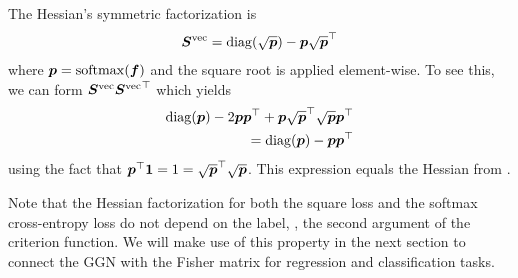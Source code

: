 \begin{example}\label{ex:crossentropyloss_hessian_factorization}
  The Hessian's symmetric factorization is \citep[\eg][]{papyan2019measurements}
  \begin{align*}
    {\bm{S}}^{\operatorname{vec}} = \operatorname{diag}(\sqrt{{\bm{p}}}) - {\bm{p}} \sqrt{{\bm{p}}}^{\top}
  \end{align*}
  where ${\bm{p}} = \mathrm{softmax}({\bm{f}})$ and the square root is applied element-wise.
  To see this, we can form ${\bm{S}}^{\operatorname{vec}} {{\bm{S}}^{\operatorname{vec}}}^{\top}$ which yields
  \begin{align*}
    \operatorname{diag}({\bm{p}}) - 2 {\bm{p}} {\bm{p}}^{\top} + {\bm{p}} \sqrt{{\bm{p}}}^{\top} \sqrt{{\bm{p}}} {\bm{p}}^{\top}
    \\
    = \operatorname{diag}({\bm{p}}) - {\bm{p}} {\bm{p}}^{\top}
  \end{align*}
  using the fact that ${\bm{p}}^{\top} {\bm{1}} = 1 = \sqrt{{\bm{p}}}^{\top} \sqrt{{\bm{p}}}$.
  This expression equals the Hessian from .
\end{example}
Note that the Hessian factorization for both the square loss and the softmax cross-entropy loss do not depend on the label, \ie, the second argument of the criterion function.
We will make use of this property in the next section to connect the GGN with the Fisher matrix for regression and classification tasks.

